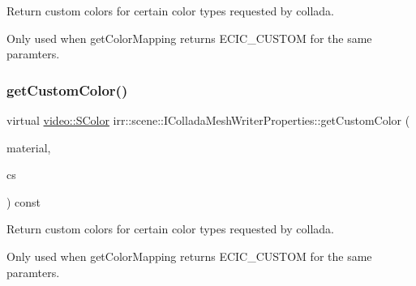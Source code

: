 Return custom colors for certain color types requested by collada. 

Only used when get\+Color\+Mapping returns E\+C\+I\+C\+\_\+\+C\+U\+S\+T\+OM for the same paramters. \mbox{\label{classirr_1_1scene_1_1IColladaMeshWriterProperties_a8028af2323dab63df4bdfeb292ec48cd}} 
\subsubsection{\texorpdfstring{get\+Custom\+Color()}{getCustomColor()}\hspace{0.1cm}{\footnotesize\ttfamily [2/2]}}
{\footnotesize\ttfamily virtual \hyperlink{classirr_1_1video_1_1SColor}{video\+::\+S\+Color} irr\+::scene\+::\+I\+Collada\+Mesh\+Writer\+Properties\+::get\+Custom\+Color (\begin{DoxyParamCaption}\item[{const \hyperlink{classirr_1_1video_1_1SMaterial}{video\+::\+S\+Material} \&}]{material,  }\item[{\hyperlink{namespaceirr_1_1scene_a6204218341c6b449d879cd8367b2f8d8}{E\+\_\+\+C\+O\+L\+L\+A\+D\+A\+\_\+\+C\+O\+L\+O\+R\+\_\+\+S\+A\+M\+P\+L\+ER}}]{cs }\end{DoxyParamCaption}) const\hspace{0.3cm}{\ttfamily [pure virtual]}}



Return custom colors for certain color types requested by collada. 

Only used when get\+Color\+Mapping returns E\+C\+I\+C\+\_\+\+C\+U\+S\+T\+OM for the same paramters. \mbox{\label{classirr_1_1scene_1_1IColladaMeshWriterProperties_ab7ec58f708ebebe941246e6c78b0691d}} 
